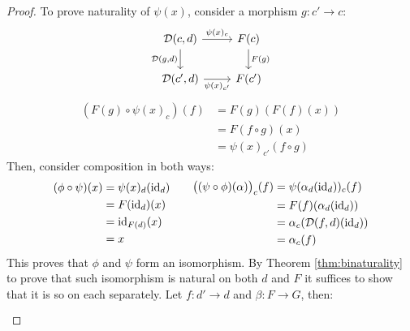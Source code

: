 \begin{theorem}
\begin{proof}
    To prove naturality of $\psi(x)$, consider a morphism $g:c'\to c$:
    \[\begin{tikzcd}[ampersand replacement=\&]
      {\D(c,d)} \& {F(c)} \\
      {\D(c',d)} \& {F(c')}
      \arrow["{\psi(x)_c}", from=1-1, to=1-2]
      \arrow["{\psi(x)_{c'}}"', from=2-1, to=2-2]
      \arrow["{\D(g,d)}"', from=1-1, to=2-1]
      \arrow["{F(g)}", from=1-2, to=2-2]
    \end{tikzcd}\]
    \[
      \begin{aligned}
        (F(g)\circ \psi(x)_c)(f)
        &= F(g)(F(f)(x))\\
        &= F(f\circ g)(x)\\
        &= \psi(x)_{c'}(f\circ g)
      \end{aligned}
    \]
    Then, consider composition in both ways:
    \[
      \begin{aligned}
        (\phi \circ \psi)(x)
        &= \psi(x)_{d}(\mathrm{id}_d)\\
        &= F(\mathrm{id}_d)(x)\\
        &= \mathrm{id}_{F(d)}(x)\\
        &= x
      \end{aligned}
      \qquad
      \begin{aligned}
        \big((\psi \circ \phi)(\alpha)\big)_c(f)
        &= \psi (\alpha_d(\mathrm{id}_d))_c(f)\\
        &= F(f)(\alpha_d(\mathrm{id}_d))\\
        &= \alpha_c(\mathcal{D}(f, d)(\mathrm{id}_d))\\
        &= \alpha_c(f)
      \end{aligned}
    \]
    This proves that $\phi$ and $\psi$ form an isomorphism. By Theorem
    \ref{thm:binaturality} to prove that such isomorphism is natural on both $d$
    and $F$ it suffices to show that it is so on each separately. Let $f: d' \to
    d$ and $\beta: F \to G$, then:
    \[
      \begin{gathered}
        \\

\end{gathered}\]
\end{proof}
\end{theorem}
